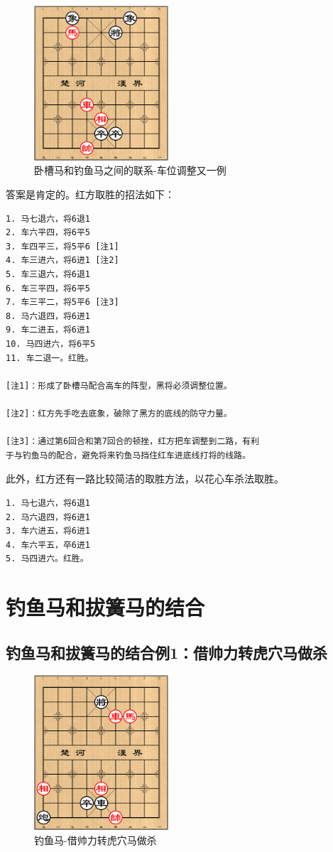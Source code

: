 \documentclass[a5paper,twoside]{book}
\begin{document}
\begin{figure}[H]
\centering
\includegraphics[width=5cm]{pic/卧槽马和钓鱼马之间的联系-车位调整又一例.png}
\caption{卧槽马和钓鱼马之间的联系-车位调整又一例}
\end{figure}

答案是肯定的。红方取胜的招法如下：
\begin{verbatim}
1. 马七退六，将6退1
2. 车六平四，将6平5
3. 车四平三，将5平6 [注1]
4. 车三进六，将6进1 [注2]
5. 车三退六，将6退1
6. 车三平四，将6平5
7. 车三平二，将5平6 [注3]
8. 马六退四，将6进1
9. 车二进五，将6进1
10. 马四进六，将6平5
11. 车二退一。红胜。

[注1]：形成了卧槽马配合高车的阵型，黑将必须调整位置。

[注2]：红方先手吃去底象，破除了黑方的底线的防守力量。

[注3]：通过第6回合和第7回合的顿挫，红方把车调整到二路，有利
于与钓鱼马的配合，避免将来钓鱼马挡住红车进底线打将的线路。
\end{verbatim}

此外，红方还有一路比较简洁的取胜方法，以花心车杀法取胜。

\begin{verbatim}
1. 马七退六，将6退1
2. 马六退四，将6进1
3. 车六进五，将6进1
4. 车六平五，卒6进1
5. 马四进六。红胜。
\end{verbatim}


\section{钓鱼马和拔簧马的结合}
\label{sec-3-6}
\subsection{钓鱼马和拔簧马的结合例1：借帅力转虎穴马做杀}
\label{sec-3-6-1}
\begin{figure}[H]
\centering
\includegraphics[width=5cm]{pic/钓鱼马-借帅力转虎穴马做杀.png}
\caption{钓鱼马-借帅力转虎穴马做杀}
\end{figure}
\end{document}
